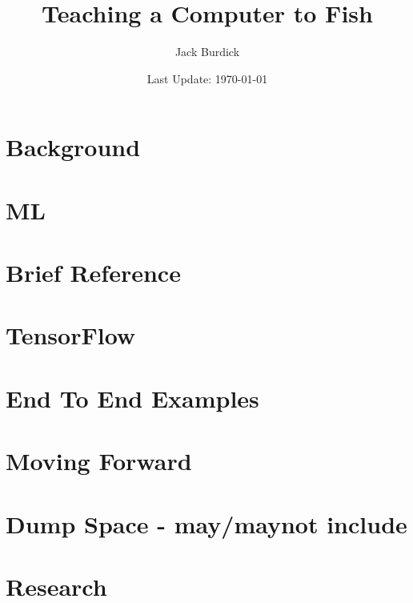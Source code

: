 \documentclass[12pt]{book}
\title{Teaching a Computer to Fish}
\author{Jack Burdick}
\date{Last Update: \today} %
\begin{document}
 
	
\frontmatter

\maketitle 

\tableofcontents


\mainmatter

\part{Background}








\part{ML}









\part{Brief Reference}




\part{TensorFlow}




\part{End To End Examples}




\part{Moving Forward}




\part{Dump Space - may/maynot include}






\part{Research}





\backmatter 


\printindex




\end{document}
